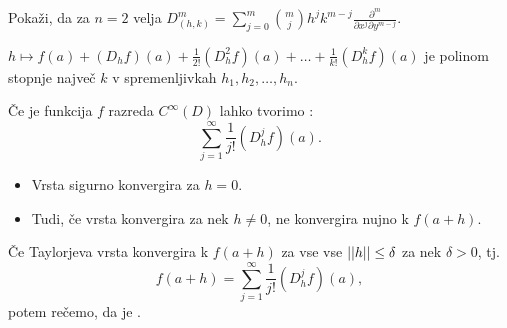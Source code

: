 \begin{primer}
    Pokaži, da za $n=2$ velja $D_{(h,k)}^m = \sum_{j=0}^{m} \binom{m}{j} h^j k^{m-j} \frac{\partial^m}{\partial x^j \partial y^{m-j}}$.
\end{primer}

\begin{opomba}
    $h \mapsto f(a) + (D_hf)(a) + \frac{1}{2!}(D_h^2f)(a) + \ldots + \frac{1}{k!} (D_h^kf)(a) $ je polinom stopnje največ $k$ v spremenljivkah $h_1, h_2, \ldots, h_n$.
\end{opomba}

\begin{opomba}
    Če je funkcija $f$ razreda $C^\infty(D)$ lahko tvorimo :
    $$\sum_{j=1}^{\infty} \frac{1}{j!} (D_h^j f)(a).$$
    \begin{itemize}
        \item Vrsta sigurno konvergira za $h=0$.
        \item Tudi, če vrsta konvergira za nek $h \neq 0$, ne konvergira nujno k $f(a+h)$.
    \end{itemize}
\end{opomba}

\newpage
\begin{definicija}
    Če Taylorjeva vrsta konvergira k $f(a+h)$ za vse vse $||h|| \leq \delta$ za nek $\delta > 0$, tj. 
    $$f(a+h) = \sum_{j=1}^{\infty} \frac{1}{j!} (D_h^j f)(a),$$
    potem rečemo, da je .
\end{definicija}